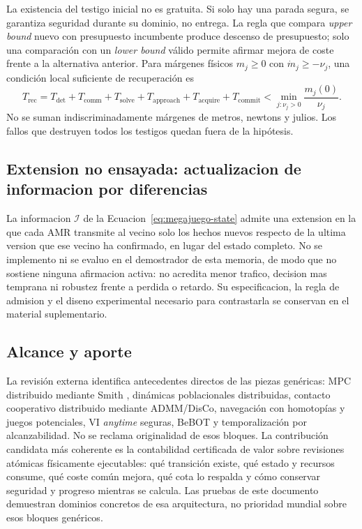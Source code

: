 La existencia del testigo inicial no es gratuita. Si solo hay una parada
segura, se garantiza seguridad durante su dominio, no entrega. La regla que
compara \emph{upper bound} nuevo con presupuesto incumbente produce descenso
de presupuesto; solo una comparación con un \emph{lower bound} válido permite
afirmar mejora de coste frente a la alternativa anterior. Para márgenes
físicos $m_j\geq0$ con $\dot m_j\geq-\nu_j$, una condición local suficiente
de recuperación es
\[
 T_{\mathrm{rec}}=T_{\det}+T_{\mathrm{comm}}+T_{\mathrm{solve}}+T_{\mathrm{approach}}+T_{\mathrm{acquire}}+T_{\mathrm{commit}}
 <\min_{j:\nu_j>0}\frac{m_j(0)}{\nu_j}.
\]
No se suman indiscriminadamente márgenes de metros, newtons y julios. Los
fallos que destruyen todos los testigos quedan fuera de la hipótesis.

\subsection{Extension no ensayada: actualizacion de informacion por diferencias}
\label{app:megajuego-epistemic-detail}

La informacion $\mathcal I$ de la Ecuacion~\eqref{eq:megajuego-state} admite una
extension en la que cada AMR transmite al vecino solo los hechos nuevos respecto
de la ultima version que ese vecino ha confirmado, en lugar del estado completo.
No se implemento ni se evaluo en el demostrador de esta memoria, de modo que no
sostiene ninguna afirmacion activa: no acredita menor trafico, decision mas
temprana ni robustez frente a perdida o retardo. Su especificacion, la regla de
admision y el diseno experimental necesario para contrastarla se conservan en el
material suplementario.

\subsection{Alcance y aporte}
\label{app:megajuego-scope}

La revisión externa identifica antecedentes directos de las piezas
genéricas: MPC distribuido mediante Smith \parencite*{barreiro2017distributed},
dinámicas poblacionales distribuidas, contacto cooperativo distribuido
mediante ADMM/DisCo, navegación con homotopías y juegos potenciales, VI
\emph{anytime} seguras, BeBOT y temporalización por alcanzabilidad. No se
reclama originalidad de esos bloques. La contribución candidata más coherente
es la contabilidad certificada de valor sobre revisiones atómicas físicamente
ejecutables: qué transición existe, qué estado y recursos consume, qué coste
común mejora, qué cota lo respalda y cómo conservar seguridad y progreso
mientras se calcula. Las pruebas de este documento demuestran dominios
concretos de esa arquitectura, no prioridad mundial sobre esos bloques
genéricos.

